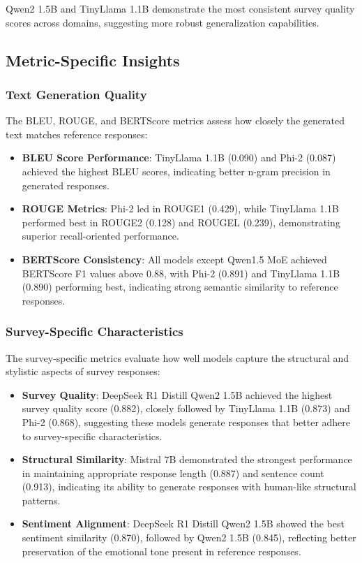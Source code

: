 \documentclass[11pt]{article}
\begin{document}
Qwen2 1.5B and TinyLlama 1.1B demonstrate the most consistent survey quality scores across domains, suggesting more robust generalization capabilities.

\subsection{Metric-Specific Insights}

\subsubsection{Text Generation Quality}

The BLEU, ROUGE, and BERTScore metrics assess how closely the generated text matches reference responses:

\begin{itemize}
\item \textbf{BLEU Score Performance}: TinyLlama 1.1B (0.090) and Phi-2 (0.087) achieved the highest BLEU scores, indicating better n-gram precision in generated responses.

\item \textbf{ROUGE Metrics}: Phi-2 led in ROUGE1 (0.429), while TinyLlama 1.1B performed best in ROUGE2 (0.128) and ROUGEL (0.239), demonstrating superior recall-oriented performance.

\item \textbf{BERTScore Consistency}: All models except Qwen1.5 MoE achieved BERTScore F1 values above 0.88, with Phi-2 (0.891) and TinyLlama 1.1B (0.890) performing best, indicating strong semantic similarity to reference responses.
\end{itemize}

\subsubsection{Survey-Specific Characteristics}

The survey-specific metrics evaluate how well models capture the structural and stylistic aspects of survey responses:

\begin{itemize}
\item \textbf{Survey Quality}: DeepSeek R1 Distill Qwen2 1.5B achieved the highest survey quality score (0.882), closely followed by TinyLlama 1.1B (0.873) and Phi-2 (0.868), suggesting these models generate responses that better adhere to survey-specific characteristics.

\item \textbf{Structural Similarity}: Mistral 7B demonstrated the strongest performance in maintaining appropriate response length (0.887) and sentence count (0.913), indicating its ability to generate responses with human-like structural patterns.

\item \textbf{Sentiment Alignment}: DeepSeek R1 Distill Qwen2 1.5B showed the best sentiment similarity (0.870), followed by Qwen2 1.5B (0.845), reflecting better preservation of the emotional tone present in reference responses.
\end{itemize}
\end{document}
